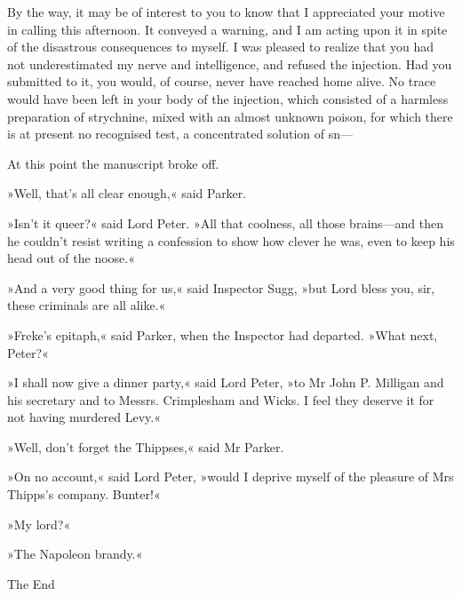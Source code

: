 By the way, it may be of interest to you to know that I appreciated your motive in calling this afternoon. It conveyed a warning, and I am acting upon it in spite of the disastrous consequences to myself. I was pleased to realize that you had not underestimated my nerve and intelligence, and refused the injection. Had you submitted to it, you would, of course, never have reached home alive. No trace would have been left in your body of the injection, which consisted of a harmless preparation of strychnine, mixed with an almost unknown poison, for which there is at present no recognised test, a concentrated solution of sn---

At this point the manuscript broke off.

»Well, that's all clear enough,« said Parker.

»Isn't it queer?« said Lord Peter. »All that coolness, all those brains—and then he couldn't resist writing a confession to show how clever he was, even to keep his head out of the noose.«

»And a very good thing for us,« said Inspector Sugg, »but Lord bless you, sir, these criminals are all alike.«

»Freke's epitaph,« said Parker, when the Inspector had departed. »What next, Peter?«

»I shall now give a dinner party,« said Lord Peter, »to Mr John P. Milligan and his secretary and to Messrs. Crimplesham and Wicks. I feel they deserve it for not having murdered Levy.«

»Well, don't forget the Thippses,« said Mr Parker.

»On no account,« said Lord Peter, »would I deprive myself of the pleasure of Mrs Thipps's company. Bunter!«

»My lord?«

»The Napoleon brandy.«

\begin{center}\mytitlefont\reasonablyhuge
	The End
\end{center}